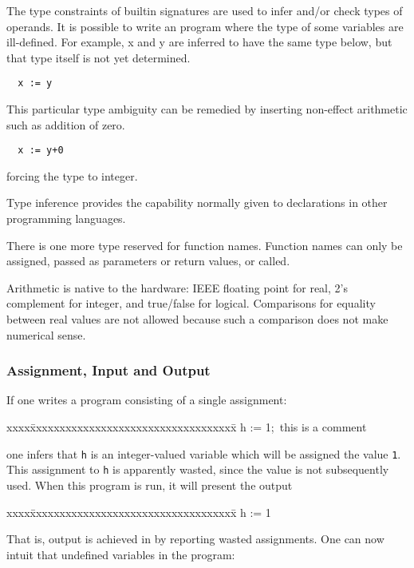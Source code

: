 \noindent 
The type constraints of builtin signatures are used to infer and/or 
check types of operands.  
It is possible to write an  program where the type of some 
variables are ill-defined.  
For example, x and y are inferred to have the same type below, 
but that type itself is not yet determined.
\begin{verbatim}
  x := y
\end{verbatim}
This particular type ambiguity can be remedied by inserting 
non-effect arithmetic such as addition of zero.
\begin{verbatim}
  x := y+0
\end{verbatim}
forcing the type to integer.

Type inference provides the capability normally given to declarations in 
other programming languages.

There is one more type reserved for function names.  
Function names can only be assigned, 
passed as parameters or return values, or called.

Arithmetic is native to the hardware: IEEE floating point for
real, 2's complement for integer, and true/false for logical.  
Comparisons for equality between real values are not allowed because 
such a comparison does not make numerical sense.

\subsubsection{Assignment, Input and Output}

If one writes a program consisting of a single assignment:
\begin{tt}
\begin{tabbing}
xxxx\=xxxxxxxxxxxxxxxxxxxxxxxxxxxxxxxxxxx\=\kill
\>h := 1;\>\bq\ this is a comment
\end{tabbing}
\end{tt}

\noindent
one infers that {\tt h} is an integer-valued variable which will be 
assigned the value {\tt 1}.  
This assignment to {\tt h} is apparently wasted, since the value is not 
subsequently used.  
When this program is run, it will present the output

\begin{tt}
\begin{tabbing}
xxxx\=xxxxxxxxxxxxxxxxxxxxxxxxxxxxxxxxxxx\=\kill
\>h := 1
\end{tabbing}
\end{tt}

\noindent
That is, output is achieved in  by reporting wasted assignments.  
One can now intuit that undefined variables in the program:

